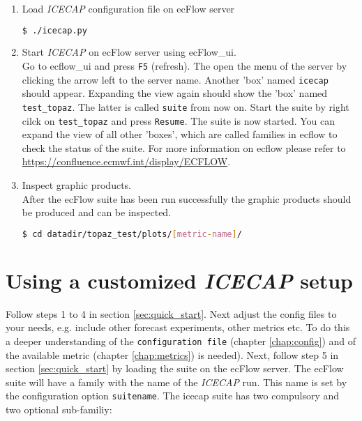 \documentclass[DIV=10, parskip=full]{scrreprt}
\newcommand{\ice}{\textit{ICECAP}\xspace}
\begin{document}
\begin{enumerate}
	\item Load \ice configuration file on ecFlow server\\
	\begin{lstlisting}[language=bash, float]
		$ ./icecap.py
	\end{lstlisting}
	\item Start \ice on ecFlow server using ecFlow\_ui. \\
	Go to ecflow\_ui and press \texttt{F5} (refresh). The open the menu of the server by clicking the arrow left to the server name. Another 'box' named \texttt{icecap} should appear. Expanding the view again should show the 'box' named \texttt{test\_topaz}. The latter is called \texttt{suite} from now on. Start the suite by  right cilck on \texttt{test\_topaz} and press \texttt{Resume}. The suite is now started. You can expand the view of all other 'boxes', which are called families in ecflow to check the status of the suite. For more information on ecflow please refer to  \url{https://confluence.ecmwf.int/display/ECFLOW}.
	
	\item Inspect graphic products.  \\
	After the ecFlow suite has been run successfully the graphic products should be produced and can be inspected.
	\begin{lstlisting}[language=bash, float]
		$ cd datadir/topaz_test/plots/[metric-name]/
	\end{lstlisting}
	
\end{enumerate}



\section{Using a customized \ice setup} 
Follow steps 1 to 4 in section \ref{sec:quick_start}. Next adjust the config files to your needs, e.g. include other forecast experiments, other metrics etc. To do this a deeper understanding of the \texttt{configuration file} (chapter \ref{chap:config}) and of the available metric (chapter \ref{chap:metrics}) is needed). Next, follow step 5 in section \ref{sec:quick_start} by loading the suite on the ecFlow server. The ecFlow suite will have a family with the name of the \ice run. This name is set by the configuration option \texttt{suitename}. The icecap suite has two compulsory and two optional sub-familiy:
\end{document}

